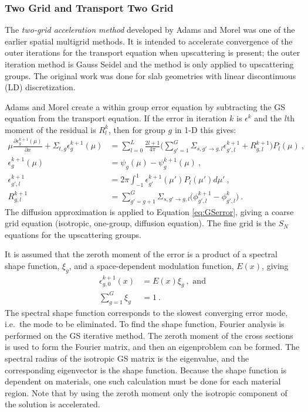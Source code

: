 \documentclass[12pt]{article}
\newcommand{\Macro}{\ensuremath{\Sigma}}
\newcommand{\Sn}{\ensuremath{S_N} }
\begin{document}
\subsubsection*{Two Grid and Transport Two Grid}
The \textit{two-grid acceleration method} developed by Adams and Morel was one of the earlier spatial multigrid methods. %
It is intended to accelerate convergence of the outer iterations for the transport equation when upscattering is present; the outer iteration method is Gauss Seidel and the method is only applied to upscattering groups. The original work was done for slab geometries with linear discontinuous (LD) discretization. %

Adams and Morel create a within group error equation by subtracting the GS equation from the transport equation. If the error in iteration $k$ is $\epsilon^k$ and the $l$th moment of the residual is $R_l^k$, then for group $g$ in 1-D this gives:
%
\begin{align}
   \mu \frac{\partial \epsilon_{g}^{k+1}(\mu)}{\partial x} + \Macro_{t,g} \epsilon_{g}^{k+1}(\mu) &= \sum_{l=0}^{L}\frac{2l+1}{4\pi} \bigl( \sum_{g'=1}^{G}\Macro_{s,g' \to g, l} \epsilon_{g',l}^{k+1} 
   +  R_{g,l}^{k+1}\bigr) P_{l}(\mu) \:,\label{eq:GSerror} \\
  \epsilon_{g}^{k+1}(\mu) &= \psi_{g}(\mu) - \psi_{g}^{k+1}(\mu) \:, \\
  \epsilon_{g',l}^{k+1} &= 2\pi \int_{-1}^{1}\epsilon_{g'}^{k+1}(\mu') P_{l}(\mu') d\mu' \:, \\ 
  R_{g,l}^{k+1} &=  \sum_{g'=g+1}^{G}\Macro_{s,g' \to g, l} \bigl( \phi_{g',l}^{k+1} - \phi_{g',l}^{k} \bigr) \:.
\end{align}
%
The diffusion approximation is applied to Equation \eqref{eq:GSerror}, giving a coarse grid equation (isotropic, one-group, diffusion equation). The fine grid is the \Sn equations for the upscattering groups.  

It is assumed that the zeroth moment of the error is a product of a spectral shape function, $\xi_g$, and a space-dependent modulation function, $E(x)$, giving
%
\begin{align}
  \epsilon_{g,0}^{k+1}(x) &= E(x)\xi_{g} \:, \text{ and} \label{eq:errorExpand} \\
  \sum_{g=1}^{G} \xi_{g} &= 1 \:.
\end{align} 
%
The spectral shape function corresponds to the slowest converging error mode, i.e.\ the mode to be eliminated. To find the shape function, Fourier analysis is performed on the GS iterative method. The zeroth moment of the cross sections is used to form the Fourier matrix, and then an eigenproblem can be formed. The spectral radius of the isotropic GS matrix is the eigenvalue, and the corresponding eigenvector is the shape function. Because the shape function is dependent on materials, one such calculation must be done for each material region. Note that by using the zeroth moment only the isotropic component of the solution is accelerated.
\end{document}
